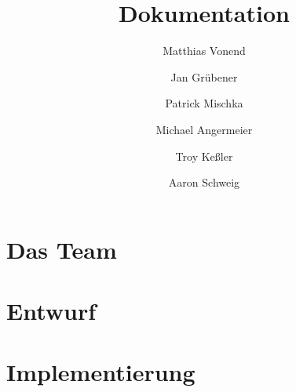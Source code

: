 \documentclass[a4paper]{article}
\title{Dokumentation}
\author{
    Matthias Vonend
    \and
    Jan Grübener
    \and
    Patrick Mischka
    \and
    Michael Angermeier
    \and
    Troy Keßler
    \and
    Aaron Schweig
    \and
}
\theoremstyle{definition}
\begin{document}
    \maketitle

    \section{Das Team}

    \section{Entwurf}

    \section{Implementierung}
\end{document}
